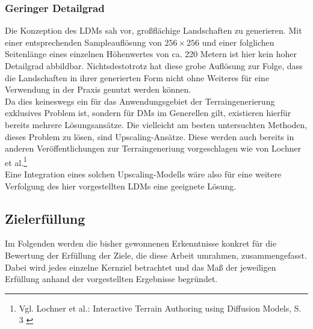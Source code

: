 \subsubsection{Geringer Detailgrad}

Die Konzeption des \ac{LDM}s sah vor, großflächige Landschaften zu generieren. Mit einer entsprechenden Sampleauflösung von $256\times256$ und einer folglichen Seitenlänge eines einzelnen Höhenwertes von ca. 220 Metern ist hier kein hoher Detailgrad abbildbar. Nichtsdestotrotz hat diese grobe Auflösung zur Folge, dass die Landschaften in ihrer generierten Form nicht ohne Weiteres für eine Verwendung in der Praxis genutzt werden können. \\
Da dies keineswegs ein für das Anwendungsgebiet der Terraingenerierung exklusives Problem ist, sondern für \ac{DM}s im Generellen gilt, existieren hierfür bereits mehrere Lösungsansätze. Die vielleicht am besten untersuchten Methoden, dieses Problem zu lösen, sind Upscaling-Ansätze. Diese werden auch bereits in anderen Veröffentlichungen zur Terraingeneriung vorgeschlagen wie von Lochner et al.\footnote{
    Vgl. Lochner et al.: Interactive Terrain Authoring using Diffusion Models, S. 3
    \cite{lochner2023interactive}
} \\
Eine Integration eines solchen Upscaling-Modells wäre also für eine weitere Verfolgung des hier vorgestellten \ac{LDM}s eine geeignete Lösung.

\subsection{Zielerfüllung}

Im Folgenden werden die bisher gewonnenen Erkenntnisse konkret für die Bewertung der Erfüllung der Ziele, die diese Arbeit umrahmen, zusammengefasst. Dabei wird jedes einzelne Kernziel betrachtet und das Maß der jeweiligen Erfüllung anhand der vorgestellten Ergebnisse begründet.

